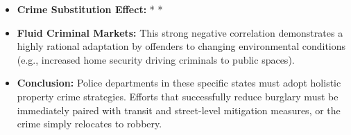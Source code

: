 \documentclass[
]{article}
\providecommand{\tightlist}{%
  \setlength{\itemsep}{0pt}\setlength{\parskip}{0pt}}
\begin{document}
\begin{itemize}
\tightlist
\item
  \textbf{Crime Substitution Effect:} * *
\item
  \textbf{Fluid Criminal Markets:} This strong negative correlation
  demonstrates a highly rational adaptation by offenders to changing
  environmental conditions (e.g., increased home security driving
  criminals to public spaces).
\item
  \textbf{Conclusion:} Police departments in these specific states must
  adopt holistic property crime strategies. Efforts that successfully
  reduce burglary must be immediately paired with transit and
  street-level mitigation measures, or the crime simply relocates to
  robbery.
\end{itemize}
\end{document}
